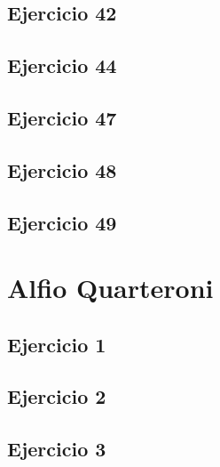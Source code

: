 \documentclass[12pt]{article}
\begin{document}
\subsection{Ejercicio 42}
 

\subsection{Ejercicio 44}
 

\subsection{Ejercicio 47}


\subsection{Ejercicio 48}
 

\subsection{Ejercicio 49}



\section{Alfio Quarteroni}

\subsection{Ejercicio 1}
 

\subsection{Ejercicio 2}
 

\subsection{Ejercicio 3}
 

\end{document}
